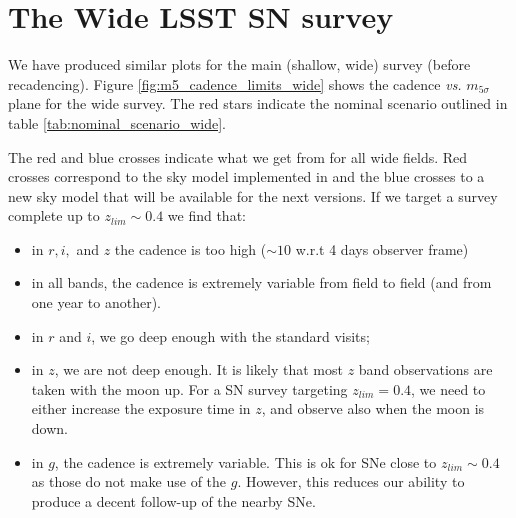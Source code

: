 \documentclass[\docopts]{\docclass}
\begin{document}
\section{The Wide LSST SN survey}
\label{sec:wide_cadence}

We have produced similar plots for the main (shallow, wide) survey
(before recadencing). Figure \ref{fig:m5_cadence_limits_wide} shows
the cadence {\em vs.}  $m_{5\sigma}$ plane for the wide survey.  The
red stars indicate the nominal scenario outlined in table \ref{tab:nominal_scenario_wide}.

The red and blue crosses indicate what we get from 
for all  wide fields. Red crosses correspond to the sky model implemented in
 \cite{1991PASP..103.1033K} and the blue crosses to
a new sky model that will be available for the next  versions.  If we target a survey complete up to $z_{lim} \sim 0.4$
we find that:
\begin{itemize}
  \item in $r, i, $ and $z$ the cadence is too high ($\sim 10$ w.r.t 4 days observer frame)
  \item in all bands, the cadence is extremely variable from field to
    field (and from one year to another).
  \item in $r$ and $i$, we go deep enough with the standard visits;
  \item in $z$, we are not deep enough. It is likely that most $z$
    band observations are taken with the moon up. For a SN survey targeting 
    $z_{lim} = 0.4$, we need to either increase the exposure time in $z$, and 
    observe also when the moon is down.    
  \item in $g$, the cadence is extremely variable. This is ok for SNe
    close to $z_{lim} \sim 0.4$ as those do not make use of the $g$.  However, 
    this reduces our ability to produce a decent follow-up of the nearby SNe.
\end{itemize}
\end{document}
